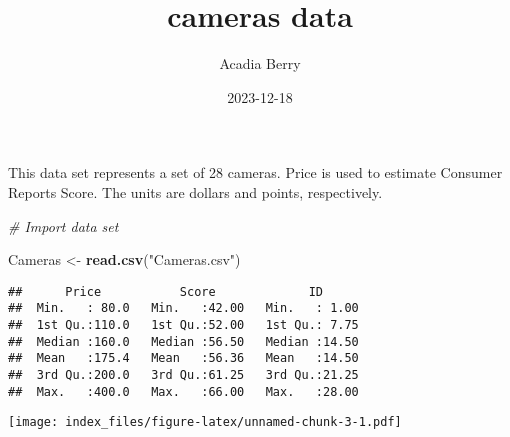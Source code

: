 \documentclass[
]{article}
\title{cameras data}
\author{Acadia Berry}
\date{2023-12-18}
\newenvironment{Shaded}{\begin{snugshade}}{\end{snugshade}}
\newcommand{\CommentTok}[1]{\textcolor[rgb]{0.56,0.35,0.01}{\textit{#1}}}
\newcommand{\DecValTok}[1]{\textcolor[rgb]{0.00,0.00,0.81}{#1}}
\newcommand{\FunctionTok}[1]{\textcolor[rgb]{0.13,0.29,0.53}{\textbf{#1}}}
\newcommand{\NormalTok}[1]{#1}
\newcommand{\OtherTok}[1]{\textcolor[rgb]{0.56,0.35,0.01}{#1}}
\newcommand{\SpecialCharTok}[1]{\textcolor[rgb]{0.81,0.36,0.00}{\textbf{#1}}}
\newcommand{\StringTok}[1]{\textcolor[rgb]{0.31,0.60,0.02}{#1}}
\begin{document}
\maketitle

This data set represents a set of 28 cameras. Price is used to estimate
Consumer Reports Score. The units are dollars and points, respectively.

\begin{Shaded}
\begin{Highlighting}[]
\CommentTok{\# Import data set}

\NormalTok{Cameras }\OtherTok{\textless{}{-}} \FunctionTok{read.csv}\NormalTok{(}\StringTok{"Cameras.csv"}\NormalTok{)}
\end{Highlighting}
\end{Shaded}

\begin{Shaded}
\end{Shaded}

\begin{verbatim}
##      Price           Score             ID       
##  Min.   : 80.0   Min.   :42.00   Min.   : 1.00  
##  1st Qu.:110.0   1st Qu.:52.00   1st Qu.: 7.75  
##  Median :160.0   Median :56.50   Median :14.50  
##  Mean   :175.4   Mean   :56.36   Mean   :14.50  
##  3rd Qu.:200.0   3rd Qu.:61.25   3rd Qu.:21.25  
##  Max.   :400.0   Max.   :66.00   Max.   :28.00
\end{verbatim}

\begin{Shaded}
\end{Shaded}

\texttt{[image: index\_files/figure-latex/unnamed-chunk-3-1.pdf]}

\begin{Shaded}
\end{Shaded}
\end{document}
